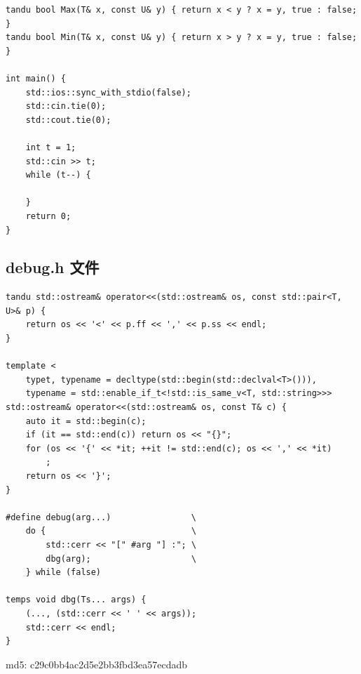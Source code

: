 \documentclass[UTF8, a4paper, titlepage, twoside]{ctexart}
\begin{document}
\begin{lstlisting}[style = cpp]
tandu bool Max(T& x, const U& y) { return x < y ? x = y, true : false; }
tandu bool Min(T& x, const U& y) { return x > y ? x = y, true : false; }

int main() {
    std::ios::sync_with_stdio(false);
    std::cin.tie(0);
    std::cout.tie(0);

    int t = 1;
    std::cin >> t;
    while (t--) {
        
    }
    return 0;
}
\end{lstlisting}

\subsection{ debug.h 文件 }

\begin{lstlisting}[style=cpp]
tandu std::ostream& operator<<(std::ostream& os, const std::pair<T, U>& p) {
    return os << '<' << p.ff << ',' << p.ss << endl;
}

template <
    typet, typename = decltype(std::begin(std::declval<T>())),
    typename = std::enable_if_t<!std::is_same_v<T, std::string>>>
std::ostream& operator<<(std::ostream& os, const T& c) {
    auto it = std::begin(c);
    if (it == std::end(c)) return os << "{}";
    for (os << '{' << *it; ++it != std::end(c); os << ',' << *it)
        ;
    return os << '}';
}

#define debug(arg...)                \
    do {                             \
        std::cerr << "[" #arg "] :"; \
        dbg(arg);                    \
    } while (false)

temps void dbg(Ts... args) {
    (..., (std::cerr << ' ' << args));
    std::cerr << endl;
}
\end{lstlisting}

md5: c29c0bb4ac2d5e2bb3fbd3ea57ecdadb
\end{document}
